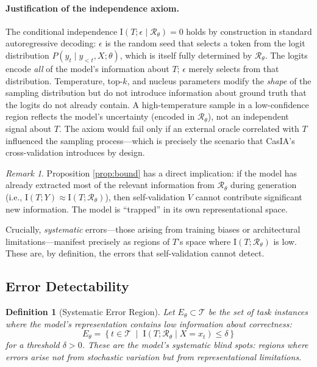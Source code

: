 \documentclass[11pt,a4paper]{article}
\newtheorem{definition}{Definition}[section]
\theoremstyle{remark}
\newtheorem{remark}{Remark}[section]
\newcommand{\MI}{\mathrm{I}}
\begin{document}
\paragraph{Justification of the independence axiom.} The conditional independence $\MI(T; \epsilon \mid \mathcal{R}_\theta) = 0$ holds by construction in standard autoregressive decoding: $\epsilon$ is the random seed that selects a token from the logit distribution $P(y_t \mid y_{<t}, X; \theta)$, which is itself fully determined by $\mathcal{R}_\theta$. The logits encode \emph{all} of the model's information about $T$; $\epsilon$ merely selects from that distribution. Temperature, top-$k$, and nucleus parameters modify the \emph{shape} of the sampling distribution but do not introduce information about ground truth that the logits do not already contain. A high-temperature sample in a low-confidence region reflects the model's uncertainty (encoded in $\mathcal{R}_\theta$), not an independent signal about $T$. The axiom would fail only if an external oracle correlated with $T$ influenced the sampling process---which is precisely the scenario that CasIA's cross-validation introduces by design.

\begin{remark}
\label{rem:bound}
Proposition \ref{prop:bound} has a direct implication: if the model has already extracted most of the relevant information from $\mathcal{R}_\theta$ during generation (i.e., $\MI(T; Y) \approx \MI(T; \mathcal{R}_\theta)$), then self-validation $V$ cannot contribute significant new information. The model is ``trapped'' in its own representational space.

Crucially, \emph{systematic} errors---those arising from training biases or architectural limitations---manifest precisely as regions of $T$'s space where $\MI(T; \mathcal{R}_\theta)$ is low. These are, by definition, the errors that self-validation cannot detect.
\end{remark}

\subsection{Error Detectability}

\begin{definition}[Systematic Error Region]
\label{def:error_region}
Let $E_\theta \subset \mathcal{T}$ be the set of task instances where the model's representation contains low information about correctness:
\begin{equation}
  E_\theta = \left\{ t \in \mathcal{T} \;\middle|\; \MI(T; \mathcal{R}_\theta \mid X = x_t) \leq \delta \right\}
\end{equation}
for a threshold $\delta > 0$. These are the model's \emph{systematic blind spots}: regions where errors arise not from stochastic variation but from representational limitations.
\end{definition}
\end{document}
